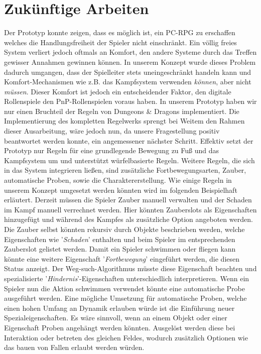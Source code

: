 \section{Zukünftige Arbeiten}
\label{sec:futurework}

Der Prototyp konnte zeigen, dass es möglich ist, ein PC-RPG zu erschaffen welches die Handlungsfreiheit der Spieler nicht einschränkt. Ein völlig freies System verliert jedoch oftmals an Komfort, den andere Systeme durch das Treffen gewisser Annahmen gewinnen können. In unserem Konzept wurde dieses Problem dadurch umgangen, dass der Spielleiter stets uneingeschränkt handeln kann und Komfort-Mechanismen wie z.B. das Kampfsystem verwenden \emph{können}, aber nicht \emph{müssen}. Dieser Komfort ist jedoch ein entscheidender Faktor, den digitale Rollenspiele den PnP-Rollenspielen voraus haben. In unserem Prototyp haben wir nur einen Bruchteil der Regeln von Dungeons \& Dragons implementiert. Die Implementierung des kompletten Regelwerks sprengt bei Weitem den Rahmen dieser Ausarbeitung, wäre jedoch nun, da unsere Fragestellung positiv beantwortet werden konnte, ein angemessener nächster Schritt.\newline
Effektiv setzt der Prototyp nur Regeln für eine grundlegende Bewegung zu Fuß und das Kampfsystem um und unterstützt würfelbasierte Regeln. Weitere Regeln, die sich in das System integrieren ließen, sind zusätzliche Fortbewegungsarten, Zauber, automatische Proben, sowie die Charaktererstellung. Wie einige Regeln in unserem Konzept umgesetzt werden könnten wird im folgenden Beispielhaft erläutert.\newline
Derzeit müssen die Spieler Zauber manuell verwalten und der Schaden im Kampf manuell verrechnet werden. Hier könnten Zauberslots als Eigenschaften hinzugefügt und während des Kampfes als zusätzliche Option angeboten werden. Die Zauber selbst könnten rekursiv durch Objekte beschrieben werden, welche Eigenschaften wie '\textit{Schaden}' enthalten und beim Spieler im entsprechenden Zauberslot gelistet werden.\newline
Damit ein Spieler schwimmen oder fliegen kann könnte eine weitere Eigenschaft '\textit{Fortbewegung}' eingeführt werden, die diesen Status anzeigt. Der Weg-such-Algorithmus müsste diese Eigenschaft beachten und spezialisierte '\textit{Hindernis}'-Eigenschaften unterschiedlich interpretieren. Wenn ein Spieler nun die Aktion schwimmen verwendet könnte eine automatische Probe ausgeführt werden.\newline
Eine mögliche Umsetzung für automatische Proben, welche einen hohen Umfang an Dynamik erlauben würde ist die Einführung neuer Spezialeigenschaften. Es wäre sinnvoll, wenn an einem Objekt oder einer Eigenschaft Proben angehängt werden könnten. Ausgelöst werden diese bei Interaktion oder betreten des gleichen Feldes, wodurch zusätzlich Optionen wie das bauen von Fallen erlaubt werden würden.\newline
